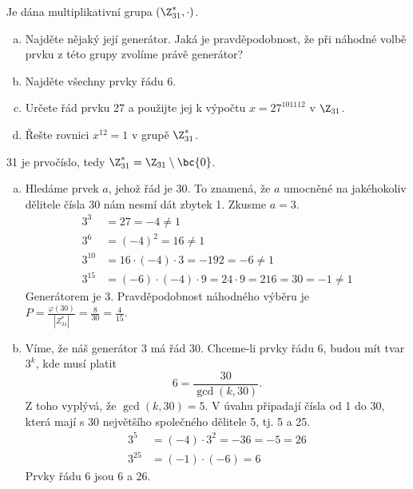 \documentclass[11pt, a4paper]{article}
\begin{document}
\begin{exercise}
Je dána multiplikativní grupa $(\Z_{31}^*, \cdot)$.
\begin{enumerate}[a)]
	\item Najděte nějaký její generátor. Jaká je pravděpodobnost, že při náhodné volbě prvku z této grupy zvolíme právě generátor?
	\item Najděte všechny prvky řádu 6.
	\item Určete řád prvku 27 a použijte jej k výpočtu $x = 27^{101112}$ v $\Z_{31}$.
	\item Řešte rovnici $x^{12}= 1$ v grupě $\Z_{31}^*$.
\end{enumerate}
\end{exercise}
\begin{solution}
	31 je prvočíslo, tedy $\Z_{31}^* = \Z_{31} \setminus \bc{0}$.
	\begin{enumerate}[a)]
		\item Hledáme prvek $a$, jehož řád je 30. To znamená, že $a$ umocněné na jakéhokoliv dělitele čísla 30 nám nesmí dát zbytek 1. Zkusme $a=3$.
		\begin{align*}
			3^3 &= 27 = -4 \not=1\\
			3^6 &= (-4)^2 = 16\not=1\\
			3^{10} &= 16 \cdot (-4) \cdot 3 = -192 = -6\not=1\\
			3^{15} &= (-6) \cdot (-4) \cdot 9 = 24 \cdot 9 = 216 = 30 = -1 \not=1
		\end{align*}
		Generátorem je 3.
		Pravděpodobnost náhodného výběru je $P = \frac{\varphi(30)}{|Z_{31}^*|}= \frac{8}{30} = \frac{4}{15}$.
		\item Víme, že náš generátor 3 má řád 30. Chceme-li prvky řádu 6, budou mít tvar $3^k$, kde musí platit
		\begin{equation}
			6 = \frac{30}{\gcd(k, 30)}.
		\end{equation}
		Z toho vyplývá, že $\gcd(k, 30) = 5$. V úvahu připadají čísla od 1 do 30, která mají s 30 největšího společného dělitele 5, tj. 5 a 25.
		\begin{align*}
			3^5 &= (-4) \cdot 3^2 = -36 = -5 = 26 \\
			3^{25} &= (-1) \cdot (-6) = 6
		\end{align*}
		Prvky řádu 6 jsou 6 a 26.
	\end{enumerate}	
\end{solution}
\end{document}
